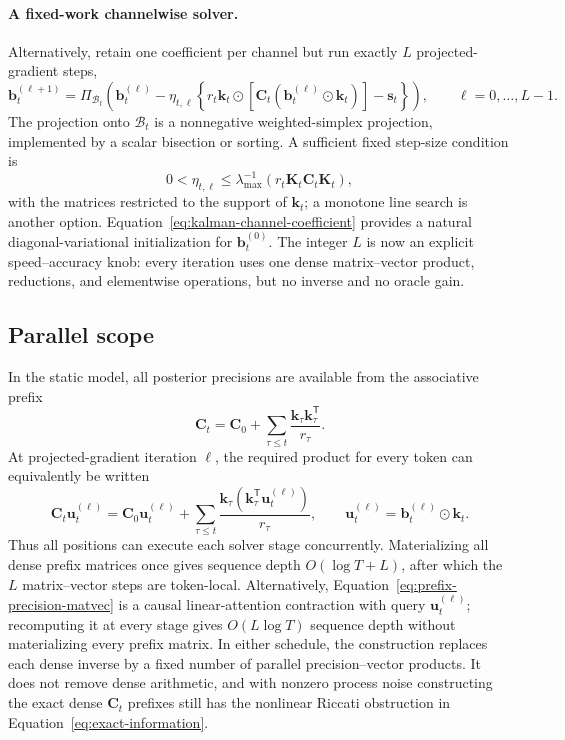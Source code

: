 \documentclass[11pt]{article}
\newcommand{\vct}[1]{\boldsymbol{#1}}
\newcommand{\tr}{\mathsf{T}}
\begin{document}
\paragraph{A fixed-work channelwise solver.}
Alternatively, retain one coefficient per channel but run exactly $L$
projected-gradient steps,
\begin{equation}
  \vct{b}_t^{(\ell+1)}
  =\Pi_{\mathcal B_t}\!\left(
    \vct{b}_t^{(\ell)}
    -\eta_{t,\ell}
      \left\{
      r_t\vct{k}_t\odot
       [\vct{C}_t(\vct{b}_t^{(\ell)}\odot\vct{k}_t)]
      -\vct{s}_t
      \right\}
  \right),
  \qquad \ell=0,\ldots,L-1.
  \label{eq:projected-gain-iteration}
\end{equation}
The projection onto $\mathcal B_t$ is a nonnegative weighted-simplex
projection, implemented by a scalar bisection or sorting.  A sufficient fixed
step-size condition is
\begin{equation}
  0<\eta_{t,\ell}\leq
  \lambda_{\max}^{-1}\!\left(
    r_t\vct{K}_t\vct{C}_t\vct{K}_t
  \right),
  \label{eq:projected-gain-step-size}
\end{equation}
with the matrices restricted to the support of $\vct{k}_t$; a monotone line
search is another option.  Equation~\eqref{eq:kalman-channel-coefficient}
provides a natural diagonal-variational initialization for $\vct{b}_t^{(0)}$.
The integer $L$ is now an explicit speed--accuracy knob: every iteration uses
one dense matrix--vector product, reductions, and elementwise operations, but
no inverse and no oracle gain.

\subsection{Parallel scope}

In the static model, all posterior precisions are available from the
associative prefix
\begin{equation}
  \vct{C}_t=\vct{C}_0+
  \sum_{\tau\leq t}\frac{\vct{k}_\tau\vct{k}_\tau^{\tr}}{r_\tau}.
\end{equation}
At projected-gradient iteration $\ell$, the required product for every token
can equivalently be written
\begin{equation}
  \vct{C}_t\vct{u}_t^{(\ell)}
  =\vct{C}_0\vct{u}_t^{(\ell)}
   +\sum_{\tau\leq t}\frac{\vct{k}_\tau
      (\vct{k}_\tau^{\tr}\vct{u}_t^{(\ell)})}{r_\tau},
  \qquad
  \vct{u}_t^{(\ell)}=\vct{b}_t^{(\ell)}\odot\vct{k}_t.
  \label{eq:prefix-precision-matvec}
\end{equation}
Thus all positions can execute each solver stage concurrently.  Materializing
all dense prefix matrices once gives sequence depth $O(\log T+L)$, after which
the $L$ matrix--vector steps are token-local.  Alternatively,
Equation~\eqref{eq:prefix-precision-matvec} is a causal linear-attention
contraction with query $\vct{u}_t^{(\ell)}$; recomputing it at every stage gives
$O(L\log T)$ sequence depth without materializing every prefix matrix.  In
either schedule, the construction replaces each dense inverse by a fixed
number of parallel precision--vector products.  It does not remove dense
arithmetic, and with nonzero process noise constructing the exact dense
$\vct{C}_t$ prefixes still has the nonlinear Riccati obstruction in
Equation~\eqref{eq:exact-information}.
\end{document}
